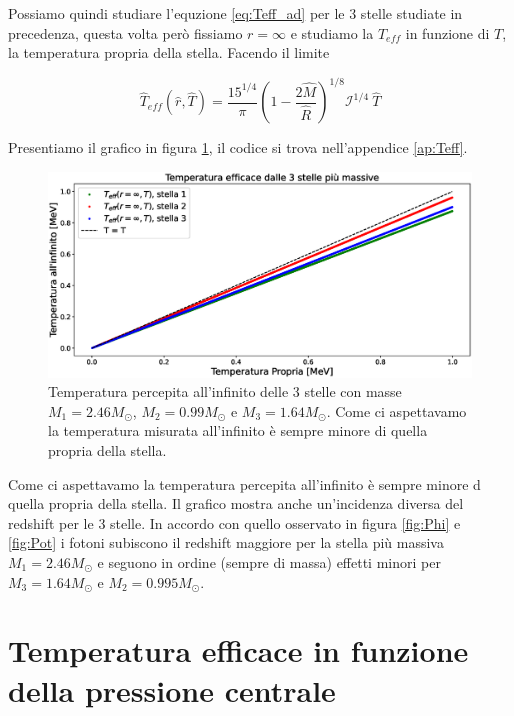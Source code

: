 \documentclass[a4paper, titlepage]{article}
\begin{document}
Possiamo quindi studiare l'equzione \ref{eq:Teff_ad} per le 3 stelle studiate in
precedenza, questa volta però fissiamo $r = \infty$ e studiamo la $T_{eff}$ in
funzione di $T$, la temperatura propria della stella.
Facendo il limite

\begin{equation}
    \hat T_{eff}(\hat r, \hat T) = \frac{15^{1/4}}{\pi}
    \left(1 - \frac{2 \hat M}{\hat R} \right)^{1/8} \mathcal I^{1/4} ~ \hat T
    \label{eq:Teff_inf}
\end{equation}

Presentiamo il grafico in figura \ref{fig:Teff}, il codice si trova
nell'appendice \ref{ap:Teff}.

\begin{figure}[h]
    \centering
    \includegraphics[width = \textwidth]{Figures/Teff.eps}
    \caption{Temperatura percepita all'infinito delle 3 stelle con masse
    $M_1 = 2.46 M_\odot$, $M_2 = 0.99 M_\odot$ e $M_3 = 1.64 M_\odot$.
    Come ci aspettavamo la temperatura misurata all'infinito è sempre minore di
    quella propria della stella.}
    \label{fig:Teff}
\end{figure}

Come ci aspettavamo la temperatura percepita all'infinito è sempre minore d
quella propria della stella.
Il grafico mostra anche un'incidenza diversa del redshift per le 3 stelle.
In accordo con quello osservato in figura \ref{fig:Phi} e \ref{fig:Pot} i fotoni
subiscono il redshift maggiore per la stella più massiva $M_1 = 2.46 M_\odot$ e
seguono in ordine (sempre di massa) effetti minori per
$M_3 = 1.64 M_\odot$ e $M_2 = 0.995 M_\odot$.


\section{Temperatura efficace in funzione della pressione centrale}
\end{document}
